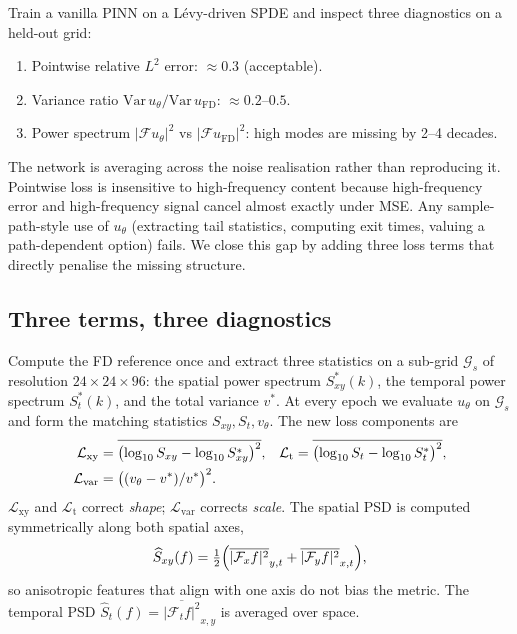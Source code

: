 \documentclass[review,12pt]{elsarticle}
\begin{document}
Train a vanilla PINN on a L\'evy-driven SPDE and inspect three
diagnostics on a held-out grid:
\begin{enumerate}
\item Pointwise relative \(L^2\) error: \(\approx 0.3\) (acceptable).
\item Variance ratio
\(\mathrm{Var}\,u_\theta / \mathrm{Var}\,u_{\mathrm{FD}}\):
\(\approx 0.2\)--\(0.5\).
\item Power spectrum \(|\mathcal F u_\theta|^2\) vs
\(|\mathcal F u_{\mathrm{FD}}|^2\): high modes are missing by 2--4
decades.
\end{enumerate}
The network is averaging across the noise realisation rather than
reproducing it. Pointwise loss is insensitive to high-frequency
content because high-frequency error and high-frequency signal
cancel almost exactly under MSE. Any sample-path-style use of
\(u_\theta\) (extracting tail statistics, computing exit times,
valuing a path-dependent option) fails. We close this gap by
adding three loss terms that directly penalise the missing
structure.

\subsection{Three terms, three diagnostics}
\label{subsec:losses}

Compute the FD reference once and extract three statistics on a
sub-grid \(\mathcal{G}_s\) of resolution \(24 \times 24 \times 96\):
the spatial power spectrum \(S^*_{xy}(k)\), the temporal power
spectrum \(S^*_t(k)\), and the total variance \(v^*\). At every epoch
we evaluate \(u_\theta\) on \(\mathcal{G}_s\) and form the matching
statistics \(S_{xy}, S_t, v_\theta\). The new loss components are
\begin{align}
\mathcal{L}_{\mathrm{xy}} &=
\overline{\bigl(\log_{10}S_{xy} - \log_{10}S^*_{xy}\bigr)^2}, &
\mathcal{L}_{\mathrm{t}} &=
\overline{\bigl(\log_{10}S_t - \log_{10}S^*_t\bigr)^2}, \notag\\
\mathcal{L}_{\mathrm{var}} &= \bigl((v_\theta - v^*)/v^*\bigr)^2.
\label{eq:losses}
\end{align}
\(\mathcal{L}_{\mathrm{xy}}\) and \(\mathcal{L}_{\mathrm{t}}\)
correct \emph{shape}; \(\mathcal{L}_{\mathrm{var}}\) corrects
\emph{scale}. The spatial PSD is computed symmetrically along both
spatial axes,
\begin{equation}
\widehat S_{xy}(f) = \tfrac12
\Bigl(\overline{|\mathcal F_x f|^2}_{y,t}
+ \overline{|\mathcal F_y f|^2}_{x,t}\Bigr),
\end{equation}
so anisotropic features that align with one axis do not bias the
metric. The temporal PSD
\(\widehat S_t(f) = \overline{|\mathcal F_t f|^2}_{x,y}\) is
averaged over space.
\end{document}
